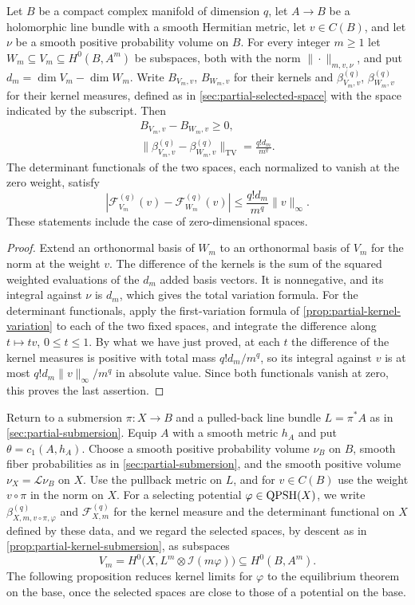 \begin{lemma}\label{lem:kernel-codimension-comparison}
Let $B$ be a compact complex manifold of dimension $q$, let $A\to B$ be a holomorphic line bundle with a smooth Hermitian metric, let $v\in C(B)$, and let $\nu$ be a smooth positive probability volume on $B$. For every integer $m\geq1$ let $W_m\subseteq V_m\subseteq H^0(B,A^m)$ be subspaces, both with the norm $\|\cdot\|_{m,v,\nu}$, and put $d_m=\dim V_m-\dim W_m$. Write $B_{V_m,v}$, $B_{W_m,v}$ for their kernels and $\beta_{V_m,v}^{(q)}$, $\beta_{W_m,v}^{(q)}$ for their kernel measures, defined as in \cref{sec:partial-selected-space} with the space indicated by the subscript. Then
\[
 \begin{gathered}
 B_{V_m,v}-B_{W_m,v}\geq0,\\
 \|\beta_{V_m,v}^{(q)}-\beta_{W_m,v}^{(q)}\|_{\mathrm{TV}}
       =\frac{q!d_m}{m^q}.
 \end{gathered}
\]
The determinant functionals of the two spaces, each normalized to vanish at the zero weight, satisfy
\[
 |\mathcal F_{V_m}^{(q)}(v)-\mathcal F_{W_m}^{(q)}(v)|
       \leq\frac{q!d_m}{m^q}\|v\|_\infty.
\]
These statements include the case of zero-dimensional spaces.
\end{lemma}
\begin{proof}
Extend an orthonormal basis of $W_m$ to an orthonormal basis of $V_m$ for the norm at the weight $v$. The difference of the kernels is the sum of the squared weighted evaluations of the $d_m$ added basis vectors. It is nonnegative, and its integral against $\nu$ is $d_m$, which gives the total variation formula. For the determinant functionals, apply the first-variation formula of \cref{prop:partial-kernel-variation} to each of the two fixed spaces, and integrate the difference along $t\mapsto tv$, $0\leq t\leq1$. By what we have just proved, at each $t$ the difference of the kernel measures is positive with total mass $q!d_m/m^q$, so its integral against $v$ is at most $q!d_m\|v\|_\infty/m^q$ in absolute value. Since both functionals vanish at zero, this proves the last assertion.
\end{proof}

Return to a submersion $\pi\colon X\to B$ and a pulled-back line bundle $L=\pi^*A$ as in \cref{sec:partial-submersion}. Equip $A$ with a smooth metric $h_A$ and put $\theta=c_1(A,h_A)$. Choose a smooth positive probability volume $\nu_B$ on $B$, smooth fiber probabilities as in \cref{sec:partial-submersion}, and the smooth positive volume $\nu_X=\mathcal L\nu_B$ on $X$. Use the pullback metric on $L$, and for $v\in C(B)$ use the weight $v\circ\pi$ in the norm on $X$. For a selecting potential $\varphi\in\mathrm{QPSH}(X)$, we write $\beta_{X,m,v\circ\pi,\varphi}^{(q)}$ and $\mathcal F_{X,m}^{(q)}$ for the kernel measure and the determinant functional on $X$ defined by these data, and we regard the selected spaces, by descent as in \cref{prop:partial-kernel-submersion}, as subspaces
\[
 V_m=H^0\bigl(X,L^m\otimes\mathcal I(m\varphi)\bigr)\subseteq H^0(B,A^m).
\]
The following proposition reduces kernel limits for $\varphi$ to the equilibrium theorem on the base, once the selected spaces are close to those of a potential on the base.

